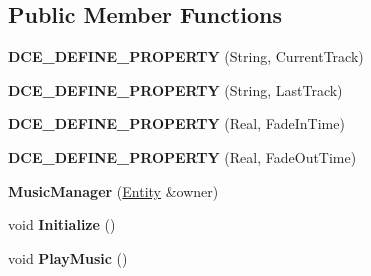 \subsection*{Public Member Functions}
\begin{DoxyCompactItemize}
\item 
\hypertarget{classDCEngine_1_1Components_1_1MusicManager_a9f505071112510c72802cb9158d93d9a}{{\bfseries D\-C\-E\-\_\-\-D\-E\-F\-I\-N\-E\-\_\-\-P\-R\-O\-P\-E\-R\-T\-Y} (String, Current\-Track)}\label{classDCEngine_1_1Components_1_1MusicManager_a9f505071112510c72802cb9158d93d9a}

\item 
\hypertarget{classDCEngine_1_1Components_1_1MusicManager_aab9bc0560e979828969a8d069872f9a2}{{\bfseries D\-C\-E\-\_\-\-D\-E\-F\-I\-N\-E\-\_\-\-P\-R\-O\-P\-E\-R\-T\-Y} (String, Last\-Track)}\label{classDCEngine_1_1Components_1_1MusicManager_aab9bc0560e979828969a8d069872f9a2}

\item 
\hypertarget{classDCEngine_1_1Components_1_1MusicManager_a8c83d15130c00fe64a91a5857d0e16fb}{{\bfseries D\-C\-E\-\_\-\-D\-E\-F\-I\-N\-E\-\_\-\-P\-R\-O\-P\-E\-R\-T\-Y} (Real, Fade\-In\-Time)}\label{classDCEngine_1_1Components_1_1MusicManager_a8c83d15130c00fe64a91a5857d0e16fb}

\item 
\hypertarget{classDCEngine_1_1Components_1_1MusicManager_aff3179d160fe7b4ace225cfe5226945d}{{\bfseries D\-C\-E\-\_\-\-D\-E\-F\-I\-N\-E\-\_\-\-P\-R\-O\-P\-E\-R\-T\-Y} (Real, Fade\-Out\-Time)}\label{classDCEngine_1_1Components_1_1MusicManager_aff3179d160fe7b4ace225cfe5226945d}

\item 
\hypertarget{classDCEngine_1_1Components_1_1MusicManager_ad17ca2e8e01ff9be3cd1e27252d5e036}{{\bfseries Music\-Manager} (\hyperlink{classDCEngine_1_1Entity}{Entity} \&owner)}\label{classDCEngine_1_1Components_1_1MusicManager_ad17ca2e8e01ff9be3cd1e27252d5e036}

\item 
\hypertarget{classDCEngine_1_1Components_1_1MusicManager_adbb678c4b40be2642afdf0a5797ba594}{void {\bfseries Initialize} ()}\label{classDCEngine_1_1Components_1_1MusicManager_adbb678c4b40be2642afdf0a5797ba594}

\item 
\hypertarget{classDCEngine_1_1Components_1_1MusicManager_a6089a7d0cadabce3350c3a8600d70c89}{void {\bfseries Play\-Music} ()}\label{classDCEngine_1_1Components_1_1MusicManager_a6089a7d0cadabce3350c3a8600d70c89}


\end{DoxyCompactItemize}
